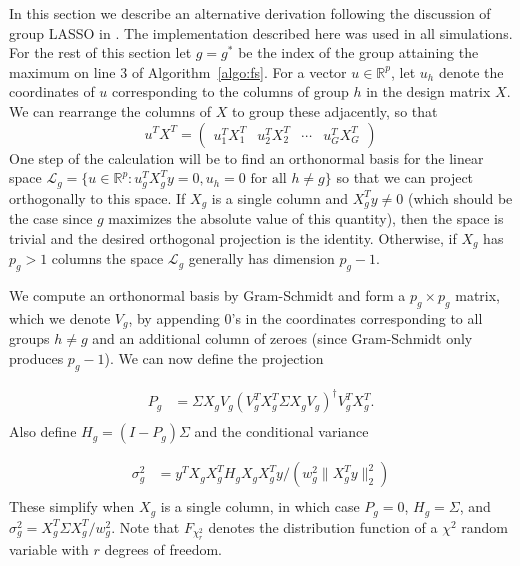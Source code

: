 \documentclass{imsart}
\newcommand{\real}{\mathbb{R}}
\newcommand{\norm}[1]{\lVert #1 \rVert}
\newcommand{\vecsp}{\mathcal{L}}
\newcommand{\gstar}{g^*}
\begin{document}
In this section we describe an alternative derivation following the
discussion of group LASSO in \cite{tests:adaptive}. The implementation
described here was used in all simulations.
For the rest of this section let $g = \gstar$ be the index of
the group attaining the maximum on line 3 of Algorithm~\ref{algo:fs}.
For a vector $u \in \real^p$, let $u_h$ denote the coordinates
of $u$ corresponding to the columns of group $h$ in the design matrix $X$.
We can rearrange the columns of $X$ to group these adjacently, so that
\[
u^TX^T = \begin{pmatrix} u_1^T X_1^T & u_2^T X_2^T & \cdots & u_G^TX_G^T \end{pmatrix}
\]
One step of the calculation will be to find an orthonormal basis for the
linear space $\vecsp_g = \{ u \in \real^p : u_g^T X_g^T y = 0, u_h = 0
\text{ for all } h \neq g \}$ so that we can project orthogonally to
this space. If $X_g$ is a single column and $X_g^Ty \neq 0$ (which
should be the case since $g$ maximizes the absolute value of this
quantity), then the
space is trivial and the desired orthogonal projection is the identity.
Otherwise, if $X_g$ has $p_g > 1$ columns the space $\vecsp_g$
generally has dimension $p_g-1$.

We compute an orthonormal basis by Gram-Schmidt and form a
$p_g \times p_g$ matrix, which we denote $V_g$, by appending
0's in the coordinates corresponding to all groups $h \neq g$ and
an additional column of zeroes (since Gram-Schmidt only produces $p_g-1$).
We can now define the projection

\begin{equation}
 \begin{aligned}
   \label{eq:proj}
   P_g &= \Sigma X_gV_g (V_g^T X_g^T \Sigma X_g V_g)^\dagger V_g^TX_g^T. \\
  \end{aligned}
\end{equation}
Also define $H_g = (I-P_g)\Sigma$ and the conditional variance

\begin{equation}
 \begin{aligned}
   \label{eq:cvar}
   \sigma^2_g &= y^TX_gX_g^T H_g X_gX_g^Ty / (w_g^2 \norm{X_g^Ty}_2^2) \\
 \end{aligned}
\end{equation}
These simplify when $X_g$ is a single column, in which case $P_g = 0$,
$H_g = \Sigma$, and $\sigma^2_g = X_g^T\Sigma X_g^T/w_g^2$.
Note that $F_{\chi^2_r}$ denotes the distribution function of a $\chi^2$
random variable with $r$ degrees of freedom.
\end{document}

